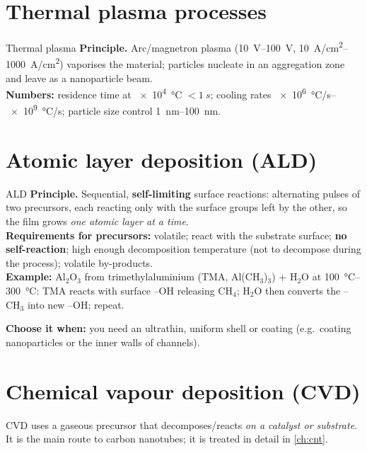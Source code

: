 \section{Thermal plasma processes}
\begin{cardbox}{Thermal plasma }
\textbf{Principle.} Arc/magnetron plasma (\SIrange{10}{100}{V}, \SIrange{10}{1000}{A/cm^2}) vaporises the material;
particles nucleate in an aggregation zone and leave as a nanoparticle beam.\\
\textbf{Numbers:} residence time at \SI{e4}{\celsius} $<\SI{1}{s}$; cooling rates \SIrange{e6}{e9}{\celsius/s};
particle size control \SIrange{1}{100}{nm}.
\end{cardbox}

\section{Atomic layer deposition (ALD)}
\begin{cardbox}{ALD }
\textbf{Principle.} Sequential, \textbf{self-limiting} surface reactions: alternating pulses of two precursors,
each reacting only with the surface groups left by the other, so the film grows \emph{one atomic layer at a time}.\\
\textbf{Requirements for precursors:} volatile; react with the substrate surface; \textbf{no self-reaction};
high enough decomposition temperature (not to decompose during the process); volatile by-products.\\
\textbf{Example:} Al$_2$O$_3$ from trimethylaluminium (TMA, Al(CH$_3$)$_3$) + H$_2$O at \SIrange{100}{300}{\celsius}:
TMA reacts with surface --OH releasing CH$_4$; H$_2$O then converts the --CH$_3$ into new --OH; repeat.
\end{cardbox}
\textbf{Choose it when:} you need an ultrathin, uniform shell or coating (e.g.\ coating nanoparticles or the inner walls
of channels).

\section{Chemical vapour deposition (CVD)}
CVD uses a gaseous precursor that decomposes/reacts \emph{on a catalyst or substrate}. It is the main route to
carbon nanotubes; it is treated in detail in \cref{ch:cnt}.
